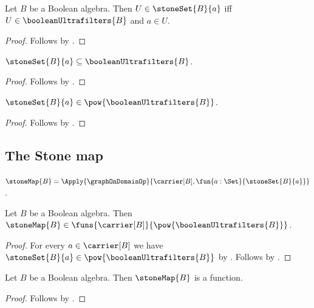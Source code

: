 \begin{proposition}\label{stone_set_iff}
    Let $B$ be a Boolean algebra.
    Then $U\in\stoneSet{B}{a}$ iff
        $U\in\booleanUltrafilters{B}$ and $a\in U$.
\end{proposition}
\begin{proof}
    Follows by .
\end{proof}

\begin{proposition}\label{stone_set_subseteq_boolean_ultrafilters}
    $\stoneSet{B}{a}\subseteq\booleanUltrafilters{B}$.
\end{proposition}
\begin{proof}
    Follows by .
\end{proof}

\begin{proposition}\label{stone_set_in_powerset}
    $\stoneSet{B}{a}\in\pow{\booleanUltrafilters{B}}$.
\end{proposition}
\begin{proof}
    Follows by
        .
\end{proof}

\subsection{The Stone map}

\begin{definition}\label{stone_map}
    $\stoneMap{B}=
        \Apply{\graphOnDomainOp}
            {\carrier[B],
             \fun{a:\Set}{\stoneSet{B}{a}}}$.
\end{definition}

\begin{theorem}\label{stone_map_type}
    Let $B$ be a Boolean algebra.
    Then $\stoneMap{B}\in
        \funs{\carrier[B]}{\pow{\booleanUltrafilters{B}}}$.
\end{theorem}
\begin{proof}
    For every $a\in\carrier[B]$ we have
        $\stoneSet{B}{a}\in\pow{\booleanUltrafilters{B}}$ by
        .
    Follows by
        .
\end{proof}

\begin{proposition}\label{stone_map_is_function}
    Let $B$ be a Boolean algebra.
    Then $\stoneMap{B}$ is a function.
\end{proposition}
\begin{proof}
    Follows by .
\end{proof}

